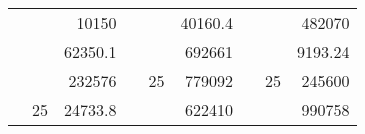 \begin{table}[H]
\begin{tabular}{|ccrccrccr}
\rowcolor[HTML]{DAE8FC} 
\multicolumn{1}{|c|}{\cellcolor[HTML]{FFFFC7}}                                & \multicolumn{1}{c|}{\cellcolor[HTML]{DAE8FC}}                      & \multicolumn{1}{r|}{\cellcolor[HTML]{DAE8FC}10150}     & \multicolumn{1}{c|}{\cellcolor[HTML]{FFFFC7}}                                & \multicolumn{1}{c|}{\cellcolor[HTML]{DAE8FC}}                       & \multicolumn{1}{r|}{\cellcolor[HTML]{DAE8FC}40160.4}   & \multicolumn{1}{c|}{\cellcolor[HTML]{FFFFC7}}                                & \multicolumn{1}{c|}{\cellcolor[HTML]{DAE8FC}}                      & \multicolumn{1}{r|}{\cellcolor[HTML]{DAE8FC}482070}    \\ \cline{3-3} \cline{6-6} \cline{9-9} 
\multicolumn{1}{|c|}{\cellcolor[HTML]{FFFFC7}}                                & \multicolumn{1}{c|}{\cellcolor[HTML]{DAE8FC}}                      & \multicolumn{1}{r|}{\cellcolor[HTML]{DDFDFF}62350.1}   & \multicolumn{1}{c|}{\cellcolor[HTML]{FFFFC7}}                                & \multicolumn{1}{c|}{\cellcolor[HTML]{DAE8FC}}                       & \multicolumn{1}{r|}{\cellcolor[HTML]{DDFDFF}692661}    & \multicolumn{1}{c|}{\cellcolor[HTML]{FFFFC7}}                                & \multicolumn{1}{c|}{\cellcolor[HTML]{DAE8FC}}                      & \multicolumn{1}{r|}{\cellcolor[HTML]{DDFDFF}9193.24}   \\ \cline{3-3} \cline{6-6} \cline{9-9} 
\rowcolor[HTML]{DAE8FC} 
\multicolumn{1}{|c|}{\cellcolor[HTML]{FFFFC7}}                                & \multicolumn{1}{c|}{\cellcolor[HTML]{DAE8FC}}                      & \multicolumn{1}{r|}{\cellcolor[HTML]{DAE8FC}232576}    & \multicolumn{1}{c|}{\cellcolor[HTML]{FFFFC7}}                                & \multicolumn{1}{c|}{\multirow{-9}{*}{\cellcolor[HTML]{DAE8FC}25}}   & \multicolumn{1}{r|}{\cellcolor[HTML]{DAE8FC}779092}    & \multicolumn{1}{c|}{\cellcolor[HTML]{FFFFC7}}                                & \multicolumn{1}{c|}{\multirow{-9}{*}{\cellcolor[HTML]{DAE8FC}25}}  & \multicolumn{1}{r|}{\cellcolor[HTML]{DAE8FC}245600}    \\ \cline{3-3} \cline{5-6} \cline{8-9} 
\multicolumn{1}{|c|}{\cellcolor[HTML]{FFFFC7}}                                & \multicolumn{1}{c|}{\multirow{-10}{*}{\cellcolor[HTML]{DAE8FC}25}} & \multicolumn{1}{r|}{\cellcolor[HTML]{DDFDFF}24733.8}   & \multicolumn{1}{c|}{\cellcolor[HTML]{FFFFC7}}                                & \multicolumn{1}{c|}{\cellcolor[HTML]{DDFDFF}}                       & \multicolumn{1}{r|}{\cellcolor[HTML]{DAE8FC}622410}    & \multicolumn{1}{c|}{\cellcolor[HTML]{FFFFC7}}                                & \multicolumn{1}{c|}{\cellcolor[HTML]{DDFDFF}}                      & \multicolumn{1}{r|}{\cellcolor[HTML]{DAE8FC}990758}    \\ \cline{2-3} \cline{6-6} \cline{9-9} 

\end{tabular}
\end{table}
